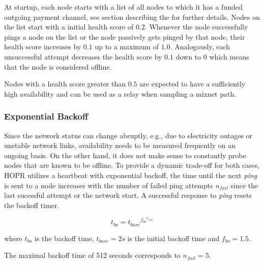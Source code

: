 At startup, each node starts with a list of all nodes to which it has a funded outgoing payment channel, see section describing the  for further details. Nodes on the list start with a initial health score of $0.2$. Whenever the node successfully pings a node on the list or the node passively gets pinged by that node, their health score increases by $0.1$ up to a maximum of $1.0$. Analogously, each unsuccessful attempt decreases the health score by $0.1$ down to $0$ which means that the node is considered offline.

Nodes with a health score greater than $0.5$ are expected to have a sufficiently high availability and can be used as a relay when sampling a mixnet path.

\subsubsection{Exponential Backoff}
\label{sec:p2p:exponential-backoff}

Since the network status can change abruptly, e.g., due to electricity outages or unstable network links, availability needs to be measured frequently on an ongoing basis. On the other hand, it does not make sense to constantly probe nodes that are known to be offline. To provide a dynamic trade-off for both cases, HOPR utilizes a heartbeat with exponential backoff, the time until the next \textit{ping} is sent to a node increases with the number of failed ping attempts $n_{fail}$ since the last sucessful attempt or the network start. A successful response to \textit{ping} resets the backoff timer.

$$ t_{bo} = {t_{base}}^{{f_{bo}}^{n_{fail}}} $$

where $t_{bo}$ is the backoff time, $t_{base} = 2s$ is the initial backoff time and $f_{bo} = 1.5$.

The maximal backoff time of 512 seconds corresponds to $n_{fail} = 5$.

